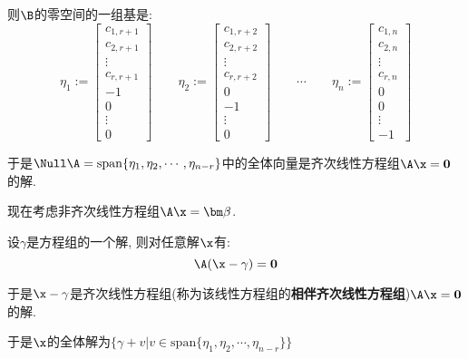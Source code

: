 \documentclass[UTF8]{ctexart}
\begin{document}
		则$\B$的零空间的一组基是: 
		\[\eta_1:=
		\begin{bmatrix}
			c_{1,r+1}\\
			c_{2,r+1}\\
			\vdots\\
			c_{r,r+1}\\
			-1\\
			0\\
			\vdots\\
			0
		\end{bmatrix}
		\qquad
		\eta_2:=
		\begin{bmatrix}
			c_{1,r+2}\\
			c_{2,r+2}\\
			\vdots\\
			c_{r,r+2}\\
			0\\
			-1\\
			\vdots\\
			0
		\end{bmatrix}
		\qquad
		\cdots
		\qquad
		\eta_n:=
		\begin{bmatrix}
			c_{1,n}\\
			c_{2,n}\\
			\vdots\\
			c_{r,n}\\
			0\\
			0\\
			\vdots\\
			-1
		\end{bmatrix}\]

		于是$\Null\A=\mathrm{span}\{\eta_1,\eta_2,\cdots,\eta_{n-r}\}$中的全体向量是齐次线性方程组$\A\x=\mathbf{0}$的解. 

		现在考虑非齐次线性方程组$\A\x=\bm\beta$. 

		设$\gamma$是方程组的一个解, 则对任意解$\x$有: 
		\[\A(\x-\gamma)=\mathbf{0}\]

		于是$\x-\gamma$是齐次线性方程组(称为该线性方程组的\textbf{相伴齐次线性方程组})$\A\x=\mathbf{0}$的解. 

		于是$\x$的全体解为$\{\gamma+v|v\in\mathrm{span}\{\eta_1,\eta_2,\cdots,\eta_{n-r}\}\}$
\end{document}
